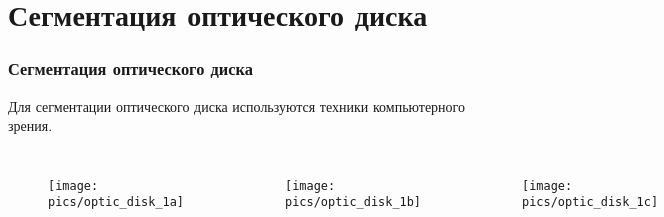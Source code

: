 \documentclass{beamer}
\begin{document}
\section{Сегментация оптического диска}

\begin{frame}
	\frametitle{Сегментация оптического диска}
	
	Для сегментации оптического диска используются техники компьютерного зрения.
	\begin{columns}[c]
		
			\begin{figure}
			\centering
			\texttt{[image: pics/optic\_disk\_1a]}
			\label{fig:optic_disk_1a}
			\end{figure}
					
			
			\begin{figure}
			\centering
			\texttt{[image: pics/optic\_disk\_1b]}
			\label{fig:optic_disk_1b}
			\end{figure}
		
			
			\begin{figure}
			\centering
			\texttt{[image: pics/optic\_disk\_1c]}
			\label{fig:optic_disk_1c}
			\end{figure}
		
	\end{columns}
\end{frame}

\end{document}
